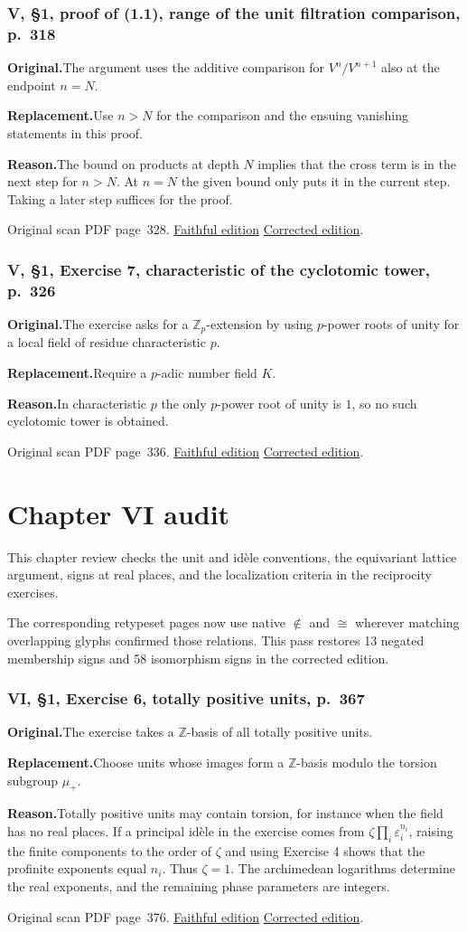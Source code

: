 \documentclass[11pt,a4paper]{article}
\newcommand{\original}{\par\smallskip\noindent\textbf{Original.}\enspace}
\newcommand{\replacement}{\par\smallskip\noindent\textbf{Replacement.}\enspace}
\newcommand{\reason}{\par\smallskip\noindent\textbf{Reason.}\enspace}
\newcommand{\editionlink}[3]{\href{#1\#errata.#2}{#3}}
\newcommand{\location}[2]{%
  \par\smallskip\noindent Original scan PDF page~#2.\enspace
  \editionlink{Neukirch_Faithful.pdf}{#1}{Faithful edition}
  \quad\editionlink{Neukirch_Corrected.pdf}{#1}{Corrected edition}.}
\begin{document}
\setcounter{section}{129}
\section{V, \S1, proof of (1.1), range of the unit filtration comparison, p.~318}\label{errata:item:130}

\original The argument uses the additive comparison for $V^n/V^{n+1}$ also at the endpoint $n=N$.
\replacement Use $n>N$ for the comparison and the ensuing vanishing statements in this proof.
\reason The bound on products at depth $N$ implies that the cross term is in the next step for $n>N$. At $n=N$ the given bound only puts it in the current step. Taking a later step suffices for the proof.
\location{130}{328}

\setcounter{section}{130}
\section{V, \S1, Exercise 7, characteristic of the cyclotomic tower, p.~326}\label{errata:item:131}

\original The exercise asks for a $\mathbb Z_p$-extension by using $p$-power roots of unity for a local field of residue characteristic $p$.
\replacement Require a $p$-adic number field $K$.
\reason In characteristic $p$ the only $p$-power root of unity is $1$, so no such cyclotomic tower is obtained.
\location{131}{336}


\clearpage
\part{Chapter VI audit}
This chapter review checks the unit and idèle conventions, the equivariant lattice argument, signs at real places, and the localization criteria in the reciprocity exercises.\par The corresponding retypeset pages now use native \(\notin\) and \(\cong\) wherever matching overlapping glyphs confirmed those relations. This pass restores 13 negated membership signs and 58 isomorphism signs in the corrected edition.
\setcounter{section}{131}
\section{VI, \S1, Exercise 6, totally positive units, p.~367}\label{errata:item:132}

\original The exercise takes a $\mathbb Z$-basis of all totally positive units.
\replacement Choose units whose images form a $\mathbb Z$-basis modulo the torsion subgroup $\mu_+$.
\reason Totally positive units may contain torsion, for instance when the field has no real places. If a principal idèle in the exercise comes from $\zeta\prod_i\varepsilon_i^{n_i}$, raising the finite components to the order of $\zeta$ and using Exercise 4 shows that the profinite exponents equal $n_i$. Thus $\zeta=1$. The archimedean logarithms determine the real exponents, and the remaining phase parameters are integers.
\location{132}{376}
\end{document}
